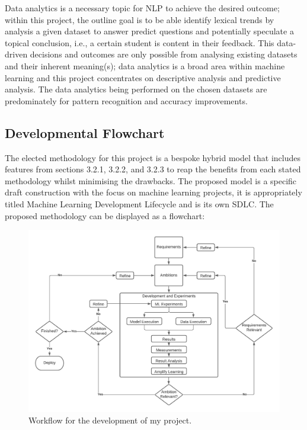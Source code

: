 Data analytics is a necessary topic for NLP to achieve the desired outcome; within this project, the outline goal is to be able identify lexical trends by analysis a given dataset to answer predict questions and potentially speculate a topical conclusion, i.e., a certain student is content in their feedback. This data-driven decisions and outcomes are only possible from analysing existing datasets and their inherent meaning(s); data analytics is a broad area within machine learning and this project concentrates on descriptive analysis and predictive analysis. The data analytics being performed on the chosen datasets are predominately for pattern recognition and accuracy improvements.

\subsection{Developmental Flowchart}

The elected methodology for this project is a bespoke hybrid model that includes features from sections 3.2.1, 3.2.2, and 3.2.3 to reap the benefits from each stated methodology whilst minimising the drawbacks. The proposed model is a specific draft construction with the focus on machine learning projects, it is appropriately titled Machine Learning Development Lifecycle and is its own SDLC. The proposed methodology can be displayed as a flowchart:

\begin{figure}[H]
    \centering
    \includegraphics[width=\textwidth]{figures/chapter-3/MLDC.pdf}
    \caption[Machine Learning Development Lifecycle]{Workflow for the development of my project.
    \label{fig:MLDC}}
\end{figure}

